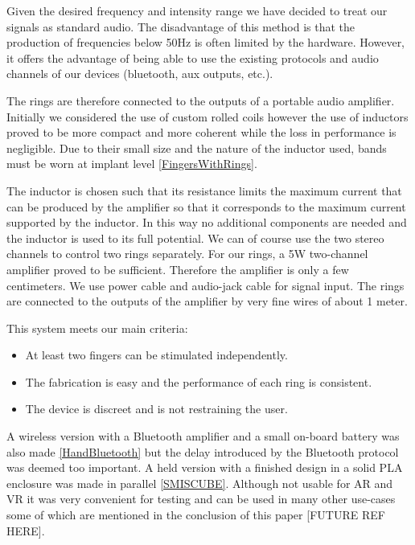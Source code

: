 \documentclass[10pt,journal,compsoc]{IEEEtran}
\begin{document}
Given the desired frequency and intensity range we have decided to treat our signals as standard audio. The disadvantage of this method is that the production of frequencies below 50Hz is often limited by the hardware. However, it offers the advantage of being able to use the existing protocols and audio channels of our devices (bluetooth, aux outputs, etc.).

The rings are therefore connected to the outputs of a portable audio amplifier. Initially we considered the use of custom rolled coils however the use of inductors proved to be more compact and more coherent while the loss in performance is negligible. Due to their small size and the nature of the inductor used, bands must be worn at implant level \ref{FingersWithRings}.

The inductor is chosen such that its resistance limits the maximum current that can be produced by the amplifier so that it corresponds to the maximum current supported by the inductor. In this way no additional components are needed and the inductor is used to its full potential. We can of course use the two stereo channels to control two rings separately. For our rings, a 5W two-channel amplifier proved to be sufficient. Therefore the amplifier is only a few centimeters. We use power cable and audio-jack cable for signal input. The rings are connected to the outputs of the amplifier by very fine wires of about 1 meter. 

This system meets our main criteria:
\begin {itemize}
\item At least two fingers can be stimulated independently.
\item The fabrication is easy and the performance of each ring is consistent.
\item The device is discreet and is not restraining the user.
\end {itemize}

A wireless version with a Bluetooth amplifier and a small on-board battery was also made \ref{HandBluetooth} but the delay introduced by the Bluetooth protocol was deemed too important.
A held version with a finished design in a solid PLA enclosure was made in parallel \ref{SMISCUBE}. Although not usable for AR and VR it was very convenient for testing and can be used in many other use-cases some of which are mentioned in the conclusion of this paper [FUTURE REF HERE].
\end{document}
